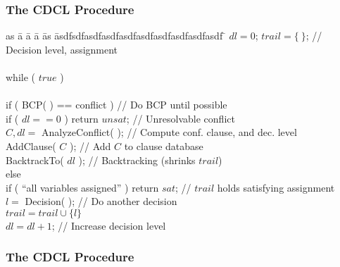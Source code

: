\begin{frame}
  \frametitle{The CDCL Procedure}

  \scriptsize

  \vfill

  \begin{tabbing}
  as \= a \= a \= a \= as \= asdfsdfasdfasdfasdfasdfasdfasdfasdfasdf \= \kill
  \> $dl = 0$; $trail = \{\ \}$;                              \> \> \> \> \> // Decision level, assignment\\ \\
  \> while ( $true$ ) \\ \\
  \> \> if ( BCP( ) == conflict )                                \> \> \> \> // Do BCP until possible \\
  \> \> \> if ( $dl == 0$ ) return $unsat$;                         \> \> \> // Unresolvable conflict \\
  \> \> \> $C,dl =$ {\sc AnalyzeConflict}( );                           \> \> \> // Compute conf. clause, and dec. level \\
  \> \> \> {\sc AddClause}( $C$ );                                      \> \> \> // Add $C$ to clause database \\
  \> \> \> {\sc BacktrackTo}( $dl$ );                                   \> \> \> // Backtracking (shrinks $trail$) \\
  \> \> else \\
  \> \> \> if ( ``all variables assigned'' ) return $sat$;          \> \> \> // $trail$ holds satisfying assignment \\
  \> \> \> $l = $ {\sc Decision}( );                                      \> \> \> // Do another decision \\
  \> \> \> $trail = trail \cup \{ l \}$ \\                          
  \> \> \> $dl = dl + 1$;                                           \> \> \> // Increase decision level \\
  \end{tabbing}

  \vfill

\end{frame}

\begin{frame}
  \frametitle{The CDCL Procedure}

  \begin{center}
  \scalebox{.45}{}
  \end{center}

\end{frame}

